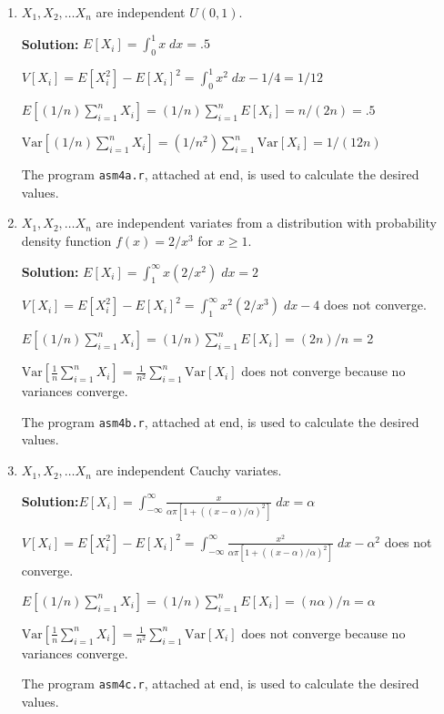 \documentclass[11pt]{article} %
\newcommand{\tr}{\textrm}
\newcommand{\var}{\tr{Var}}
\begin{document}
\begin{enumerate}
\begin{enumerate}

\item $X_1, X_2, \ldots X_n$ are independent $U(0,1)$.

{\bf Solution:} $E[X_i] = \int_0^1x\;dx = .5$

$V[X_i] = E[X_i^2] - E[X_i]^2 = \int_0^1x^2\;dx - 1/4  = 1/12$

$E[(1/n)\sum_{i = 1}^nX_i] = (1/n)\sum_{i = 1}^nE[X_i] = n/(2n) = .5$

$\var[(1/n)\sum_{i = 1}^nX_i] = (1/n^2)\sum_{i =1}^n\var[X_i] = 1/(12n)$

The program \texttt{asm4a.r}, attached at end, is used to calculate the desired values.

\item $X_1, X_2, \ldots X_n$ are independent variates from a distribution with probability density function $f(x) = 2/x^3$ for $x \ge 1$.

{\bf Solution:} $E[X_i] = \int_1^\infty x(2/x^2)\;dx = 2$

$V[X_i] = E[X_i^2] - E[X_i]^2 = \int_1^\infty x^2(2/x^3)\;dx - 4$ does not converge.

$E[(1/n)\sum_{i = 1}^nX_i] = (1/n)\sum_{i = 1}^nE[X_i] = (2n)/n$ = 2

$\var[\frac{1}{n}\sum_{i = 1}^nX_i] = \frac{1}{n^2}\sum_{i =1}^n\var[X_i]$ does not converge because no variances converge.

The program \texttt{asm4b.r}, attached at end, is used to calculate the desired values.

\item $X_1, X_2, \ldots X_n$ are independent Cauchy variates.

{\bf Solution:}$E[X_i] = \int_{-\infty}^\infty \frac{x}{\alpha\pi[1 + ((x-\alpha)/\alpha)^2]}\;dx = \alpha$

$V[X_i] = E[X_i^2] - E[X_i]^2 = \int_{-\infty}^\infty \frac{x^2}{\alpha\pi[1 + ((x-\alpha)/\alpha)^2]}\;dx - \alpha^2$ does not converge.

$E[(1/n)\sum_{i = 1}^nX_i] = (1/n)\sum_{i = 1}^nE[X_i] = (n\alpha)/n = \alpha$

$\var[\frac{1}{n}\sum_{i = 1}^nX_i] = \frac{1}{n^2}\sum_{i =1}^n\var[X_i]$ does not converge because no variances converge.

The program \texttt{asm4c.r}, attached at end, is used to calculate the desired values.

\end{enumerate}


\end{enumerate}
\end{document}
